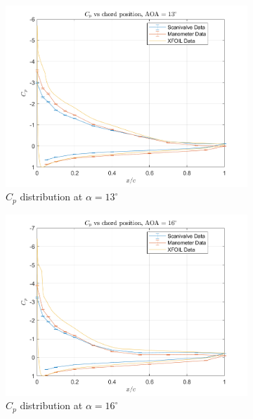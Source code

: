 \documentclass[runningheads]{llncs}
\begin{document}
\begin{figure}[H]
\begin{subfigure}[b]{0.37\textwidth}
        \includegraphics[width=\textwidth]{figures/AOA13.png}
        \caption{$C_p$ distribution at $\alpha = 13^\circ$}
        \label{fig:cp_13}
    \end{subfigure}
    \begin{subfigure}[b]{0.37\textwidth}
        \centering
        \includegraphics[width=\textwidth]{figures/AOA16.png}
        \caption{$C_p$ distribution at $\alpha = 16^\circ$}
        \label{fig:cp_16}
    \end{subfigure}
    \begin{subfigure}[b]{0.37\textwidth}
        \centering

\end{subfigure}
\end{figure}
\end{document}
